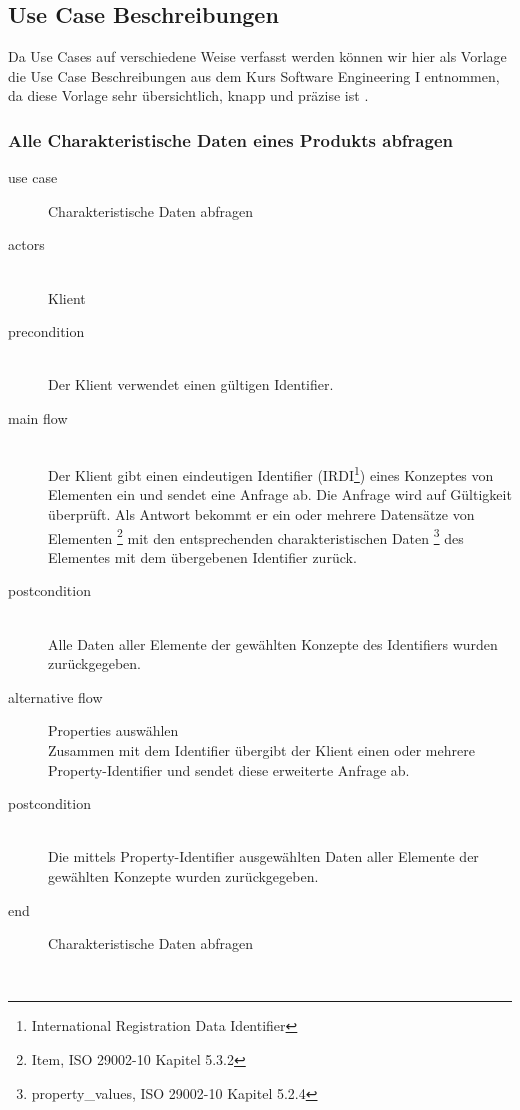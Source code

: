 \subsection{Use Case Beschreibungen}

Da \glspl{Use Case} auf verschiedene Weise verfasst werden können wir hier als Vorlage die \gls{Use Case} Beschreibungen aus dem Kurs Software Engineering I entnommen, da diese Vorlage sehr übersichtlich, knapp und präzise ist \citep[Vgl.][S. 120ff]{sixse1}. 

\subsubsection{Alle Charakteristische Daten eines Produkts abfragen}

{\small

\begin{description}
     \item[use case] Charakteristische Daten abfragen
     \item[  actors]~\\
     Klient
     \item[  precondition]~\\
     Der Klient verwendet einen gültigen Identifier.
     \item[  main flow]~\\
     Der Klient gibt einen eindeutigen Identifier (\gls{IRDI}\footnote{International Registration Data Identifier}) eines Konzeptes von Elementen ein und sendet eine Anfrage ab. Die Anfrage wird auf Gültigkeit überprüft. Als Antwort bekommt er ein oder mehrere Datensätze von Elementen \footnote{Item, ISO 29002-10 Kapitel 5.3.2} mit den entsprechenden charakteristischen Daten \footnote{property\_values, ISO 29002-10 Kapitel 5.2.4}  des Elementes mit dem übergebenen Identifier zurück.
     \item[  postcondition]~\\
     Alle Daten aller Elemente der gewählten Konzepte des Identifiers wurden zurückgegeben.    
     \item[  alternative flow] Properties auswählen ~\\
     Zusammen mit dem Identifier übergibt der Klient einen oder mehrere Property-Identifier und sendet diese erweiterte Anfrage ab.    
     \item[  postcondition]~\\
     Die mittels Property-Identifier ausgewählten Daten aller Elemente der gewählten Konzepte wurden zurückgegeben.    
     \item[end] Charakteristische Daten abfragen
\end{description}

~\\

} %

